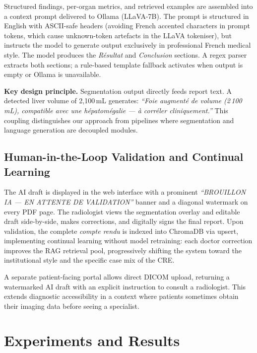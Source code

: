 \documentclass[conference]{IEEEtran}
\begin{document}
Structured findings, per-organ metrics, and retrieved examples are assembled
into a context prompt delivered to Ollama (LLaVA-7B). The prompt is
structured in English with ASCII-safe headers (avoiding French accented
characters in prompt tokens, which cause unknown-token artefacts in the
LLaVA tokeniser), but instructs the model to generate output exclusively
in professional French medical style. The model produces the
\textit{R\'{e}sultat} and \textit{Conclusion} sections. A regex parser
extracts both sections; a rule-based template fallback activates when
output is empty or Ollama is unavailable.

\textbf{Key design principle.}
Segmentation output directly feeds report text. A detected liver volume of
2{,}100\,mL generates: \textit{``Foie augment\'{e} de volume (2\,100\,mL),
compatible avec une h\'{e}patomégalie --- \`{a} corr\'{e}ler cliniquement.''}
This coupling distinguishes our approach from pipelines where segmentation and
language generation are decoupled modules.

\subsection{Human-in-the-Loop Validation and Continual Learning}

The AI draft is displayed in the web interface with a prominent
\textit{``BROUILLON IA --- EN ATTENTE DE VALIDATION''} banner and a
diagonal watermark on every PDF page. The radiologist views the segmentation
overlay and editable draft side-by-side, makes corrections, and digitally
signs the final report. Upon validation, the complete
\textit{compte rendu} is indexed into ChromaDB via upsert, implementing
continual learning without model retraining: each doctor correction improves
the RAG retrieval pool, progressively shifting the system toward the
institutional style and the specific case mix of the CRE.

A separate patient-facing portal allows direct DICOM upload, returning a
watermarked AI draft with an explicit instruction to consult a radiologist.
This extends diagnostic accessibility in a context where patients sometimes
obtain their imaging data before seeing a specialist.

\section{Experiments and Results}
\end{document}
